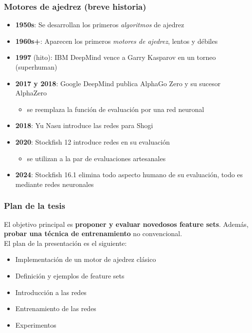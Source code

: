 \begin{frame}
\frametitle{Motores de ajedrez (breve historia)}
\begin{itemize}
    \item<1-> \textbf{1950s}: Se desarrollan los primeros \textit{algoritmos} de ajedrez
    \item<2-> \textbf{1960s+}: Aparecen los primeros \textit{motores de ajedrez}, lentos y débiles
    \item<3-> \textbf{1997} (hito): IBM DeepMind vence a Garry Kasparov en un torneo (superhuman)
    \item<4-> \textbf{2017 y 2018}: Google DeepMind publica AlphaGo Zero y su sucesor AlphaZero
    \begin{itemize}
        \item se reemplaza la función de evaluación por una red neuronal
    \end{itemize}
    \item<5-> \textbf{2018}: Yu Nasu introduce las redes  para Shogi
    \item<6-> \textbf{2020}: Stockfish 12 introduce redes  en su evaluación
    \begin{itemize}
        \item se utilizan a la par de evaluaciones artesanales
    \end{itemize}
    \item<7-> \textbf{2024}: Stockfish 16.1 elimina todo aspecto humano de su evaluación, todo es mediante redes neuronales
\end{itemize}
\end{frame}

\begin{frame}
\frametitle{Plan de la tesis}
El objetivo principal es \textbf{proponer y evaluar novedosos feature sets}. \pause Además, \textbf{probar una técnica de entrenamiento} no convencional. \\
\pause
\vspace{1em}
El plan de la presentación es el siguiente:
\begin{itemize}
\item<3-> Implementación de un motor de ajedrez clásico
\item<4-> Definición y ejemplos de feature sets
\item<5-> Introducción a las redes 
\item<6-> Entrenamiento de las redes 
\item<7-> Experimentos
\end{itemize}
\end{frame}

